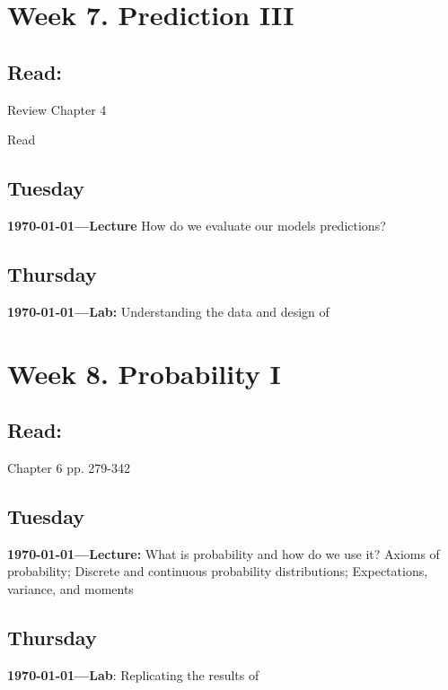\section{Week 7. Prediction III}

\subsection{Read:}

Review \citet{Imai2022-pm} Chapter 4

Read \citet{Grumbach2022-zj}

\subsection{Tuesday} \textbf{\today---Lecture} How do we evaluate our models predictions?

\AdvanceDate[2]

\subsection{Thursday} \textbf{\today---Lab:} Understanding the data and design of \citet{Grumbach2022-zj}


\AdvanceDate[5]

\vspace{2em}

\section{Week 8. Probability I}

\subsection{Read:}

\citet{Imai2022-pm} Chapter 6 pp. 279-342

\subsection{Tuesday} \textbf{\today---Lecture:} What is probability and how do we use it? Axioms of probability; Discrete and continuous probability distributions; Expectations, variance, and moments 
\AdvanceDate[2]

\subsection{Thursday} \textbf{\today---Lab}: Replicating the results of \citet{Grumbach2022-zj}

